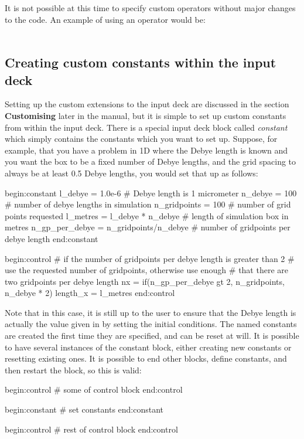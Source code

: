 It is not possible at this time to specify custom operators without major
changes to the code. An example of using an operator would be:\\
\indent{}\\

\subsection{Creating custom constants within the input deck}
Setting up the custom extensions to the input deck are discussed in the
section {\bf Customising {\EPOCH}} later in the manual, but it is simple to set
up custom constants from within the input deck. There is a special input deck
block called {\it constant} which simply contains the constants which you want
to set up. Suppose, for example, that you have a problem in 1D where the Debye
length is known and you want the box to be a fixed number of Debye lengths,
and the grid spacing to always be at least 0.5 Debye lengths, you would set
that up as follows:
\begin{boxverbatim}
begin:constant
  l_debye = 1.0e-6 # Debye length is 1 micrometer
  n_debye = 100 # number of debye lengths in simulation
  n_gridpoints = 100 # number of grid points requested
  l_metres = l_debye * n_debye # length of simulation box in metres
  n_gp_per_debye = n_gridpoints/n_debye # number of gridpoints per debye length
end:constant

begin:control
  # if the number of gridpoints per debye length is greater than 2
  # use the requested number of gridpoints, otherwise use enough
  # that there are two gridpoints per debye length
  nx = if(n_gp_per_debye gt 2, n_gridpoints, n_debye * 2)
  length_x = l_metres
end:control
\end{boxverbatim}

Note that in this case, it is still up to the user to ensure that the Debye
length is actually the value given in  by setting the
initial conditions. The named constants are created the first time they are
specified, and can be reset at will. It is possible to have several instances
of the constant block, either creating new constants or resetting existing
ones. It is possible to end other blocks, define constants, and then
restart the block, so this is valid:
\begin{boxverbatim}
begin:control
   # some of control block
end:control

begin:constant
   # set constants
end:constant

begin:control
   # rest of control block
end:control
\end{boxverbatim}

